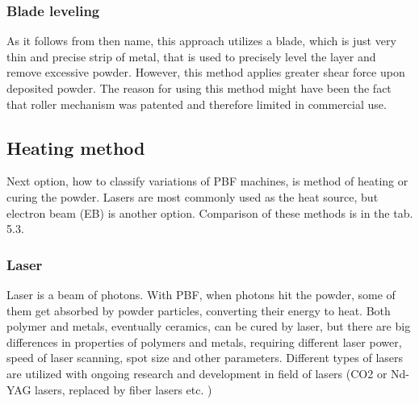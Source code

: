 \documentclass[a4paper, 11pt, reqno]{report}
\begin{document}
\subsubsection{Blade leveling}
As it follows from then name, this approach utilizes a blade, which is just very thin and precise strip of metal, that is used to precisely level the layer and remove excessive powder. However, this method applies greater shear force upon deposited powder. The reason for using this method might have been the fact that roller mechanism was patented and therefore limited in commercial use.

\subsection{Heating method}
Next option, how to classify variations of PBF machines, is method of heating or curing the powder. Lasers are most commonly used as the heat source, but electron beam (EB) is another option. Comparison of these methods is in the tab. 5.3.
\subsubsection{Laser}
Laser is a beam of photons. With PBF, when photons hit the powder, some of them get absorbed by powder particles, converting their energy to heat. Both polymer and metals, eventually ceramics, can be cured by laser, but there are big differences in properties of polymers and metals, requiring different laser power, speed of laser scanning, spot size and other parameters. Different types of lasers are utilized with ongoing research and development in field of lasers (CO2 or Nd-YAG lasers, replaced by fiber lasers etc. \cite[p. 252]{AMT})
\end{document}
